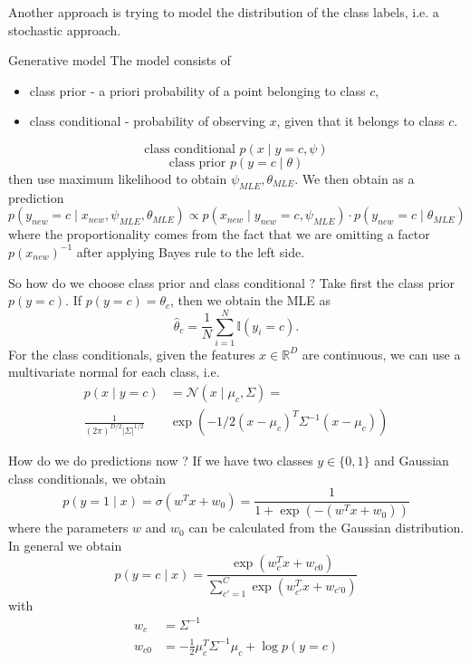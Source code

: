 \documentclass[12 pt]{article}        	%
\begin{document}
Another approach is trying to model the distribution of the class labels, i.e. a stochastic approach.
\begin{defi}{Generative model}
\newline
    The model consists of 
    \begin{itemize}
        \item 
        class prior - a priori probability of a point belonging to class $ c $,

        \item 
        class conditional - probability of observing $ x $, given that it belongs to class $ c $.
    \end{itemize}
    \[
        \text{class conditional } p ( x \mid y = c , \psi )
    \]
    \[
        \text{class prior } p ( y = c \mid \theta )
    \]
    then use maximum likelihood to obtain $ \psi_{ MLE } , \theta_{ MLE } $.
    We then obtain as a prediction
    \[
        p ( y_{ new } = c \mid x_{ new } , \psi_{ MLE } , \theta_{ MLE } )
        \propto
        p ( x_{ new } \mid y_{ new } = c , \psi_{ MLE } ) \cdot p ( y_{ new } = c \mid \theta_{ MLE } )
    \]
    where the proportionality comes from the fact that we are omitting a factor $ p ( x_{ new } ) ^ { - 1 } $ after applying Bayes rule to the left side.
\end{defi}

So how do we choose class prior and class conditional ?
Take first the class prior $ p ( y = c ) $.
If $ p ( y = c ) = \theta_c $, then we obtain the MLE as 
\[
    \hat{ \theta }_c = \frac{ 1 }{ N } \sum_{ i = 1 }^N \mathbb{ I } ( y_i = c ) .
\]
For the class conditionals, given the features $ x \in \mathbb{ R }^D $ are continuous,
we can use a multivariate normal for each class, i.e.
\begin{align*}
    p ( x \mid y = c ) 
    &=
    \mathcal{ N } ( x \mid \mu_c , \Sigma ) 
    =
    \\
    \frac{ 1 }{ ( 2 \pi )^{ D / 2 } \lvert \Sigma \rvert^{ 1 / 2 } } 
    & \exp ( -1/2 ( x - \mu_c )^T \Sigma^{ - 1 } ( x - \mu_c ) ) 
\end{align*}

How do we do predictions now ?
If we have two classes $ y \in \{ 0 , 1 \} $ and Gaussian class conditionals,
we obtain
\[
    p ( y = 1 \mid x ) = \sigma ( w^T x + w_0 )
    = \frac{ 1 }{ 1 + \exp ( - ( w^T x + w_0 ) ) }
\]
where the parameters $ w $ and $ w_0 $ can be calculated from the Gaussian distribution.
In general we obtain
\[
    p ( y = c \mid x ) 
    = 
    \frac{ \exp ( w_c^T x + w_{ c 0 } ) }{ \sum_{ c' = 1 }^C \exp ( w_{c'}^T x + w_{ c' 0 } ) }
\]
with
\begin{align*}
    w_c 
    &=
    \Sigma^{ - 1 }
    \\
    w_{c0} 
    &=
    - \frac{ 1 }{ 2 } \mu_c^T \Sigma^{ - 1 } \mu_c + \log p ( y = c ) 
\end{align*}
\end{document}
